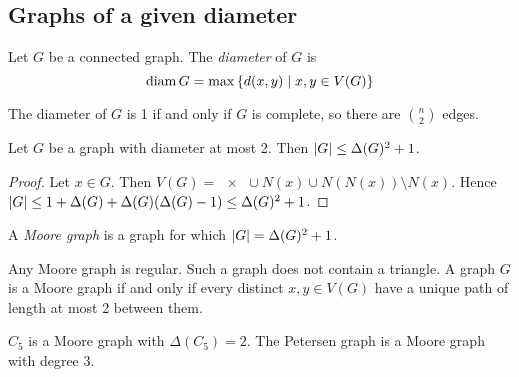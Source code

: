\subsection{Graphs of a given diameter}
\begin{definition}
	Let \( G \) be a connected graph.
	The \emph{diameter} of \( G \) is
	\[ \operatorname{diam} G = \max \qty{d(x,y) \mid x, y \in V(G)} \]
\end{definition}
\begin{remark}
	The diameter of \( G \) is 1 if and only if \( G \) is complete, so there are \( \binom n 2 \) edges.
\end{remark}
\begin{proposition}
	Let \( G \) be a graph with diameter at most 2.
	Then \( \abs{G} \leq \Delta(G)^2 + 1 \).
\end{proposition}
\begin{proof}
	Let \( x \in G \).
	Then \( V(G) = \qty{x} \cup N(x) \cup N(N(x)) \setminus N(x) \).
	Hence \( \abs{G} \leq 1 + \Delta(G) + \Delta(G)(\Delta(G) - 1) \leq \Delta(G)^2 + 1 \).
\end{proof}
\begin{definition}
	A \emph{Moore graph} is a graph for which \( \abs{G} = \Delta(G)^2 + 1 \).
\end{definition}
\begin{remark}
	Any Moore graph is regular.
	Such a graph does not contain a triangle.
	A graph \( G \) is a Moore graph if and only if every distinct \( x, y \in V(G) \) have a unique path of length at most 2 between them.
\end{remark}
\begin{example}
	\( C_5 \) is a Moore graph with \( \Delta(C_5) = 2 \).
	The Petersen graph is a Moore graph with degree 3.
\end{example}

